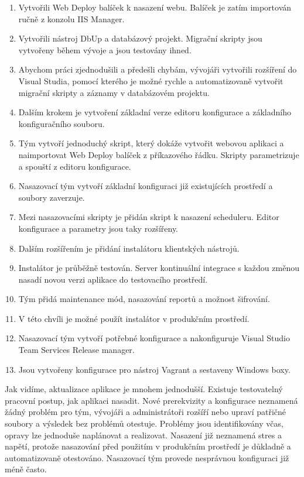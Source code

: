 \begin{enumerate}
\item Vytvořili Web Deploy balíček k nasazení webu. Balíček je zatím importován ručně z konzolu IIS Manager.
\item Vytvořili nástroj DbUp a databázový projekt. Migrační skripty jsou vytvořeny během vývoje a jsou testovány ihned.
\item Abychom práci zjednodušili a předešli chybám, vývojáři vytvořili rozšíření do Visual Studia, pomocí kterého je možné rychle a automatizovaně vytvořit migrační skripty a záznamy v databázovém projektu.
\item Dalším krokem je vytvoření základní verze editoru konfigurace a základního konfiguračního souboru.
\item Tým vytvoří jednoduchý skript, který dokáže vytvořit webovou aplikaci a naimportovat Web Deploy balíček z příkazového řádku. Skripty parametrizuje a spouští z editoru konfigurace.
\item Nasazovací tým vytvoří základní konfiguraci již existujících prostředí a soubory zaverzuje.
\item Mezi nasazovacími skripty je přidán skript k nasazení scheduleru. Editor konfigurace a parametry jsou taky rozšířeny.
\item Dalším rozšířením je přidání instalátoru klientských nástrojů.
\item Instalátor je průběžně testován. Server kontinuální integrace s každou změnou nasadí novou verzi aplikace do testovacího prostředí.
\item Tým přidá maintenance mód, nasazování reportů a možnost šifrování.
\item V této chvíli je možné použít instalátor v produkčním prostředí.
\item Nasazovací tým vytvoří potřebné konfigurace a nakonfiguruje Visual Studio Team Services Release manager.
\item Jsou vytvořeny konfigurace pro nástroj Vagrant a sestaveny Windows boxy.
\end{enumerate}

Jak vidíme, aktualizace aplikace je mnohem jednodušší. Existuje testovatelný pracovní postup, jak aplikaci nasadit. Nové prerekvizity a konfigurace neznamená žádný problém pro tým, vývojáři a administrátoři rozšíří nebo upraví patřičné soubory a výsledek bez problémů otestuje. Problémy jsou identifikovány včas, opravy lze jednoduše naplánovat a realizovat. Nasazení již neznamená stres a napětí, protože nasazování před použitím v produkčním prostředí je důkladně a automatizovaně otestováno. Nasazovací tým provede nesprávnou konfiguraci již méně často. 

